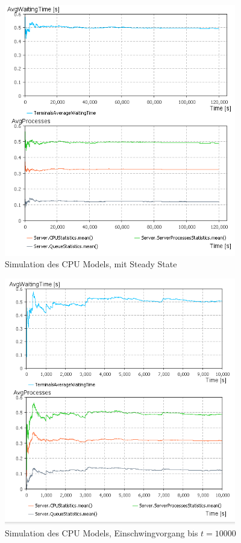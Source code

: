 \documentclass[
a4paper,   
headsepline, 
fleqn,     
11pt
]{scrartcl}
\begin{document}
\begin{figure}[h]
  \centering
  \includegraphics[width=0.9\textwidth]{./images/Simulation_SteadyState}
  \caption{Simulation des CPU Models, mit Steady State}
  \label{fig:SimulationA}
\end{figure}

\begin{figure}[h]
  \centering
  \includegraphics[width=0.9\textwidth]{./images/Simulation_t10000}
  \caption{Simulation des CPU Models, Einschwingvorgang bis $t=10000$}
  \label{fig:Simulation_t10000}
\end{figure}
\end{document}
